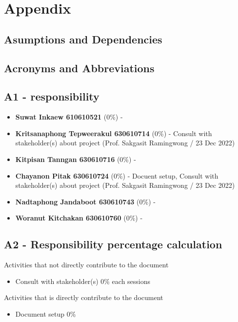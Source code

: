 \documentclass[ 10pt]{report}
\begin{document}

    \chapter{Appendix}
        \section{Asumptions and Dependencies}
        \section{Acronyms and Abbreviations}


        \section{A1 - responsibility}
        \begin{itemize}
            \item \textbf{Suwat Inkaew 610610521} (0\%) - 
            \item \textbf{Kritsanaphong Tepweerakul 630610714} (0\%) - Consult with stakeholder(s) about project (Prof. Sakgasit Ramingwong / 23 Dec 2022)
            \item \textbf{Kitpisan Tanngan 630610716} (0\%) - 
            \item \textbf{Chayanon Pitak 630610724} (0\%) - Docuent setup, Consult with stakeholder(s) about project (Prof. Sakgasit Ramingwong / 23 Dec 2022)
            \item \textbf{Nadtaphong Jandaboot 630610743} (0\%) - 
            \item \textbf{Woranut Kitchakan 630610760} (0\%) - 
        \end{itemize}

        \section{A2 - Responsibility percentage calculation}

        Activities that not directly contribute to the document
        \begin{itemize}
            \item Consult with stakeholder(s) 0\% each sessions
        \end{itemize}
        \indent\indent Activities that is directly contribute to the document
        \begin{itemize}
            \item Document setup 0\%
        \end{itemize}
\end{document}
